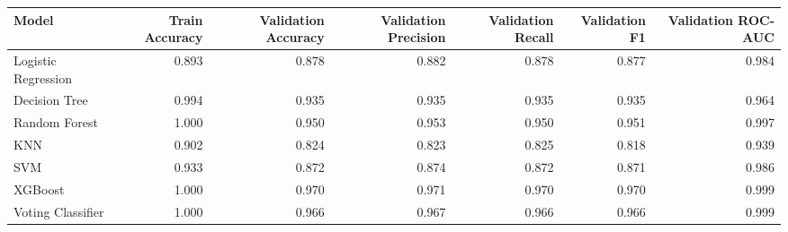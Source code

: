 \begin{tabular}{lrrrrrr}
\toprule
Model & Train Accuracy & Validation Accuracy & Validation Precision & Validation Recall & Validation F1 & Validation ROC-AUC \\
\midrule
Logistic Regression & 0.893 & 0.878 & 0.882 & 0.878 & 0.877 & 0.984 \\
Decision Tree & 0.994 & 0.935 & 0.935 & 0.935 & 0.935 & 0.964 \\
Random Forest & 1.000 & 0.950 & 0.953 & 0.950 & 0.951 & 0.997 \\
KNN & 0.902 & 0.824 & 0.823 & 0.825 & 0.818 & 0.939 \\
SVM & 0.933 & 0.872 & 0.874 & 0.872 & 0.871 & 0.986 \\
XGBoost & 1.000 & 0.970 & 0.971 & 0.970 & 0.970 & 0.999 \\
Voting Classifier & 1.000 & 0.966 & 0.967 & 0.966 & 0.966 & 0.999 \\
\bottomrule
\end{tabular}
